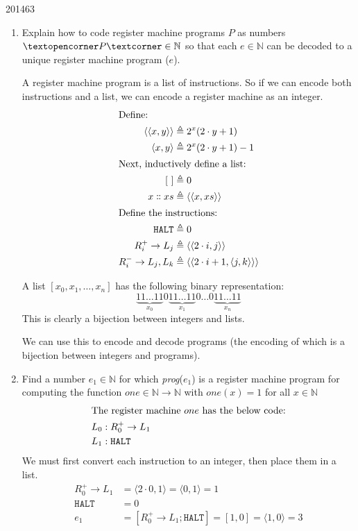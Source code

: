 \documentclass[10pt,\jkfside,a4paper]{article}
\begin{document}
\begin{examquestion}{2014}{6}{3}

\begin{enumerate}

\item Explain how to code register machine programs $P$ as numbers $
\text{\textopencorner} P \text{\textcorner} \in \mathbb{N}$ so that each $e \in
\mathbb{N}$ can be decoded to a unique register machine program
($e$).

A register machine program is a list of instructions. So if we can encode
both instructions and a list, we can encode a register machine as an integer.
\begin{align*}
\intertext{Define:}
\langle \langle x, y \rangle \rangle &\triangleq 2^x(2 \cdot y + 1) \\
\langle x, y \rangle &\triangleq 2^x(2 \cdot y + 1) - 1 \\
\intertext{Next, inductively define a list:}
[\ ] &\triangleq 0 \\
x\dblcolon xs &\triangleq \langle \langle x, xs \rangle \rangle \\
\intertext{Define the instructions:}
\texttt{HALT} &\triangleq 0 \\
R_i^+ \to L_j &\triangleq \langle \langle 2 \cdot i, j \rangle \rangle \\
R_i^- \to L_j, L_k &\triangleq \langle \langle 2 \cdot i + 1, \langle j, k
\rangle \rangle \rangle
\end{align*}

A list $[x_0, x_1, \dots, x_n ]$ has the following binary
representation:
\[
\underbrace{11\dots 11}_{x_0}0\underbrace{11\dots
11}_{x_1}0\dots 0\underbrace{11\dots 11}_{x_n}
\]
This is clearly a bijection between integers and lists.

We can use this to encode and decode programs (the encoding of which is a
bijection between integers and programs).

\item Find a number $e_1 \in \mathbb{N}$ for which \textit{prog}($e_1$) is a
register machine program for computing the function $one \in \mathbb{N} \to
\mathbb{N}$ with $one(x) = 1$ for all $x \in \mathbb{N}$
\begin{align*}
\intertext{The register machine $one$ has the below code:}
L_0 &: R_0^+ \to L_1 \\
L_1 &: \texttt{HALT}
\end{align*}
We must first convert each instruction to an integer, then place them in a
list.
\begin{align}
R_0^+ \to L_1 &= \langle 2 \cdot 0, 1 \rangle = \langle 0, 1 \rangle = 1 \\
\texttt{HALT} &= 0 \\
e_1 &= [R_0^+ \to L_1; \texttt{HALT}] = [1, 0] = \langle 1, 0 \rangle = 3
\end{align}


\end{enumerate}
\end{examquestion}
\end{document}
